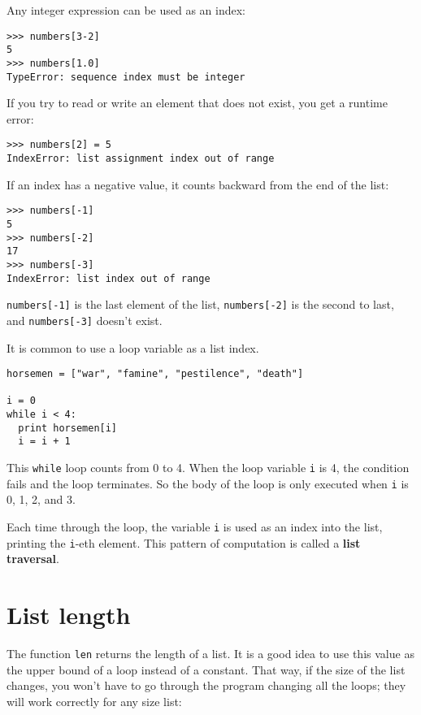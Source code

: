 Any integer expression can be used as an index:

\beforeverb
\begin{verbatim}
>>> numbers[3-2]
5
>>> numbers[1.0]
TypeError: sequence index must be integer
\end{verbatim}
\afterverb
%
If you try to read or write an element that does not exist, you
get a runtime error:


\beforeverb
\begin{verbatim}
>>> numbers[2] = 5
IndexError: list assignment index out of range
\end{verbatim}
\afterverb
%
If an index has a negative value, it counts backward from the
end of the list:

\beforeverb
\begin{verbatim}
>>> numbers[-1]
5
>>> numbers[-2]
17
>>> numbers[-3]
IndexError: list index out of range
\end{verbatim}
\afterverb
%
{\tt numbers[-1]} is the last element of the list, {\tt numbers[-2]}
is the second to last, and {\tt numbers[-3]} doesn't exist.

It is common to use a loop variable as a list index.

\beforeverb
\begin{verbatim}
horsemen = ["war", "famine", "pestilence", "death"]

i = 0
while i < 4:
  print horsemen[i]
  i = i + 1
\end{verbatim}
\afterverb
%
This {\tt while} loop counts from 0 to 4.  When the loop variable
{\tt i} is 4, the condition fails and the loop terminates.  So the
body of the loop is only executed when {\tt i} is 0, 1, 2, and 3.

Each time through the loop, the variable {\tt i} is used as an index
into the list, printing the {\tt i}-eth element.  This pattern of
computation is called a {\bf list traversal}.



\section{List length}

The function {\tt len} returns the length of a list.  It is a good
idea to use this value as the upper bound of a loop instead of a
constant.  That way, if the size of the list changes, you won't have
to go through the program changing all the loops; they will work
correctly for any size list:

